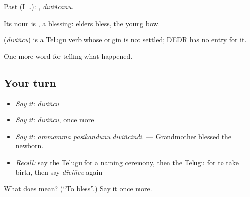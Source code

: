 Past (I …): , \emph{dīviñcānu}.

Its noun is , a blessing: elders bless, the young bow.

\begin{cousinweb}
\textbf{} (\emph{dīviñcu}) is a Telugu verb whose origin is not settled; DEDR has no entry for it.
\end{cousinweb}

\begin{grammarlens}[title={What you've built}]
One more word for telling what happened.
\end{grammarlens}

\subsection*{Your turn}
\begin{itemize}
\raggedright
  \item \emph{Say it:} \emph{dīviñcu}
  \item \emph{Say it:} \emph{dīviñcu}, once more
  \item \emph{Say it:} \emph{ammamma pasikandunu dīviñcindi.} — Grandmother blessed the newborn.
  \item \emph{Recall:} say the Telugu for a naming ceremony, then the Telugu for to take birth, then say \emph{dīviñcu} again
\end{itemize}

\begin{tcolorbox}[breakable,colback=teal!4,colframe=teal!35!black,title={Before you move on}]
What does  mean? (\textquotedblleft{}To bless\textquotedblright{}.) Say it once more.
\end{tcolorbox}

